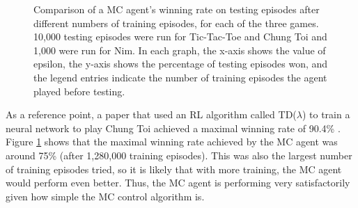 \documentclass[11pt,a4paper]{report}
\begin{document}
\begin{figure}[htbp]
    \centering
    \caption{Comparison of a MC agent's winning rate on testing episodes after different numbers of training episodes, for each of the three games. 10,000 testing episodes were run for Tic-Tac-Toe and Chung Toi and 1,000 were run for Nim. In each graph, the x-axis shows the value of epsilon, the y-axis shows the percentage of testing episodes won, and the legend entries indicate the number of training episodes the agent played before testing.}
    \label{epsilon-win-comparisons}
\end{figure}

As a reference point, a paper that used an RL algorithm called TD($\lambda$) to train a neural network to play Chung Toi achieved a maximal winning rate of 90.4\% \cite{chung-toi-params}. Figure \ref{epsilon-win-comparisons} shows that the maximal winning rate achieved by the MC agent was around 75\% (after 1,280,000 training episodes). This was also the largest number of training episodes tried, so it is likely that with more training, the MC agent would perform even better. Thus, the MC agent is performing very satisfactorily given how simple the MC control algorithm is.
\end{document}
